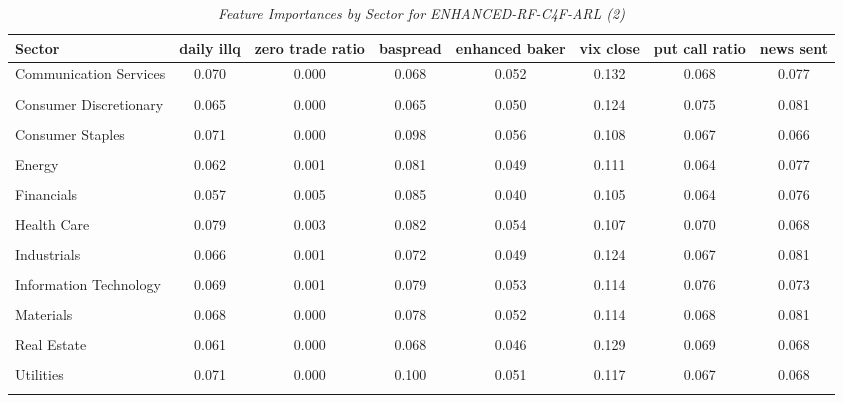             \begin{table}[ht]
            \centering
            \caption{\textit{Feature Importances by Sector for ENHANCED-RF-C4F-ARL (2)}}
            \label{tab:feature_importance_enhanced-rf-c4f-arl_2}
            \begin{tabular}{lccccccc}
            \toprule
            Sector & daily illq & zero trade ratio & baspread & enhanced baker & vix close & put call ratio & news sent \\
            \midrule
            Communication Services & 0.070 & 0.000 & 0.068 & 0.052 & 0.132 & 0.068 & 0.077 \\\\
Consumer Discretionary & 0.065 & 0.000 & 0.065 & 0.050 & 0.124 & 0.075 & 0.081 \\\\
Consumer Staples & 0.071 & 0.000 & 0.098 & 0.056 & 0.108 & 0.067 & 0.066 \\\\
Energy & 0.062 & 0.001 & 0.081 & 0.049 & 0.111 & 0.064 & 0.077 \\\\
Financials & 0.057 & 0.005 & 0.085 & 0.040 & 0.105 & 0.064 & 0.076 \\\\
Health Care & 0.079 & 0.003 & 0.082 & 0.054 & 0.107 & 0.070 & 0.068 \\\\
Industrials & 0.066 & 0.001 & 0.072 & 0.049 & 0.124 & 0.067 & 0.081 \\\\
Information Technology & 0.069 & 0.001 & 0.079 & 0.053 & 0.114 & 0.076 & 0.073 \\\\
Materials & 0.068 & 0.000 & 0.078 & 0.052 & 0.114 & 0.068 & 0.081 \\\\
Real Estate & 0.061 & 0.000 & 0.068 & 0.046 & 0.129 & 0.069 & 0.068 \\\\
Utilities & 0.071 & 0.000 & 0.100 & 0.051 & 0.117 & 0.067 & 0.068 \\\\
            \bottomrule
            \end{tabular}%
            \end{table}